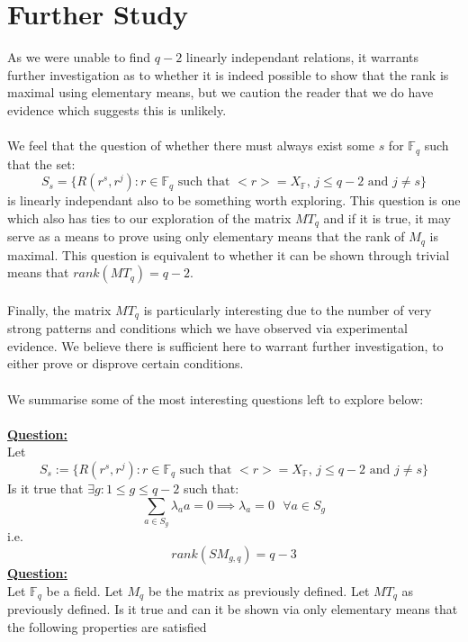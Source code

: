 \documentclass[11pt]{article}
\theoremstyle{plain}
\theoremstyle{definition}
\begin{document}
\section{Further Study}\label{section:Further Study}
As we were unable to find $q-2$ linearly independant relations, it warrants further investigation as to whether it is indeed possible to show that the rank is maximal using elementary means, but we caution the reader that we do have evidence which suggests this is unlikely.\\
\\
We feel that the question of whether there must always exist some $s$ for $\mathbb{F}_q$ such that the set:
\begin{equation*}
S_s = \{R(r^s, r^j) : r \in \mathbb{F}_q \text{ such that } <r> = X_{\mathbb{F}} \text{, } j \leq q-2 \text{ and } j\neq s\}
\end{equation*}
is linearly independant also to be something worth exploring. This question is one which also has ties to our exploration of the matrix $MT_q$ and if it is true, it may serve as a means to prove using only elementary means that the rank of $M_q$ is maximal. This question is equivalent to whether it can be shown through trivial means that $rank(MT_q) = q-2$.\\
\\
Finally, the matrix $MT_q$ is particularly interesting due to the number of very strong patterns and conditions which we have observed via experimental evidence. We believe there is sufficient here to warrant further investigation, to either prove or disprove certain conditions.\\
\\
We summarise some of the most interesting questions left to explore below:\\
\\
\textbf{\underline{Question:}}\\ Let
\begin{equation*}
S_s := \{R(r^s, r^j) : r \in \mathbb{F}_q \text{ such that } <r> = X_{\mathbb{F}} \text{, } j \leq q-2 \text{ and } j\neq s\}
\end{equation*}
Is it true that $\exists g : 1 \leq g \leq q-2$ such that:
\begin{equation*} 
\sum_{a \in S_g} \lambda_a a = 0 \implies \lambda_a=0 \text{ } \forall  a \in S_g
\end{equation*}
i.e.
\begin{equation*} 
rank(SM_{g,q}) = q-3
\end{equation*}
\textbf{\underline{Question:}} \\
Let $\mathbb{F}_q$ be a field. Let $M_q$ be the matrix as previously defined. Let $MT_q$ as previously defined. Is it true and can it be shown via only elementary means that the following properties are satisfied
\end{document}
